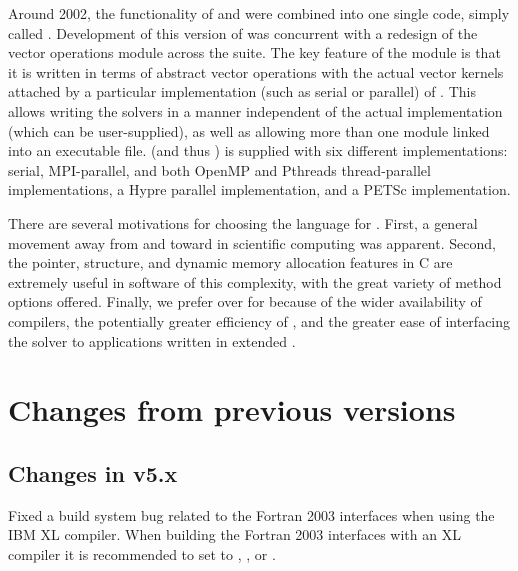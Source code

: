  Around 2002,
the functionality of {\cvode} and {\pvode} were combined into one
single code, simply called {\cvode}. Development of this version of
{\cvode} was concurrent with a redesign of the vector operations
module across the {\sundials} suite. The key feature of the
{\nvector} module is that it is written in terms of abstract vector
operations with the actual vector kernels attached by a particular
implementation (such as serial or parallel) of {\nvector}. This allows
writing the {\sundials} solvers in a manner independent of the actual
{\nvector} implementation (which can be user-supplied), as well as
allowing more than one {\nvector} module linked into an executable file.
{\sundials} (and thus {\cvode}) is supplied with six different {\nvector}
implementations:
serial, MPI-parallel, and both OpenMP and Pthreads thread-parallel
{\nvector} implementations, a Hypre parallel implementation,
and a PETSc implementation.

There are several motivations for choosing the {\CC} language for {\cvode}.
First, a general movement away from {\F} and toward {\CC} in scientific
computing was apparent.  Second, the pointer, structure, and dynamic
memory allocation features in C are extremely useful in software of
this complexity, with the great variety of method options offered.
Finally, we prefer {\CC} over {\CPP} for {\cvode} because of the wider
availability of {\CC} compilers, the potentially greater efficiency of {\CC},
and the greater ease of interfacing the solver to applications written
in extended {\F}.

\section{Changes from previous versions}

\subsection*{Changes in v5.x}

Fixed a build system bug related to the Fortran 2003 interfaces when using the
IBM XL compiler. When building the Fortran 2003 interfaces with an XL compiler
it is recommended to set  to ,
, or .

